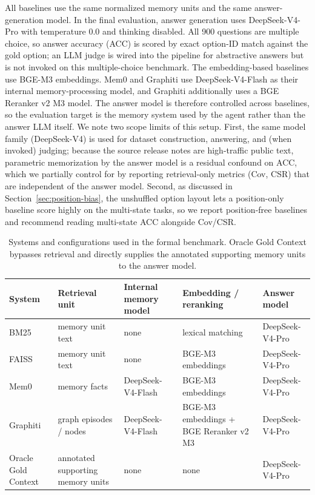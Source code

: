 All baselines use the same normalized memory units and the same answer-generation model. In the final evaluation, answer generation uses DeepSeek-V4-Pro with temperature 0.0 and thinking disabled. All 900 questions are multiple choice, so answer accuracy (ACC) is scored by exact option-ID match against the gold option; an LLM judge is wired into the pipeline for abstractive answers but is not invoked on this multiple-choice benchmark. The embedding-based baselines use BGE-M3 embeddings. Mem0 and Graphiti use DeepSeek-V4-Flash as their internal memory-processing model, and Graphiti additionally uses a BGE Reranker v2 M3 model. The answer model is therefore controlled across baselines, so the evaluation target is the memory system used by the agent rather than the answer LLM itself. We note two scope limits of this setup. First, the same model family (DeepSeek-V4) is used for dataset construction, answering, and (when invoked) judging; because the source release notes are high-traffic public text, parametric memorization by the answer model is a residual confound on ACC, which we partially control for by reporting retrieval-only metrics (Cov, CSR) that are independent of the answer model. Second, as discussed in Section~\ref{sec:position-bias}, the unshuffled option layout lets a position-only baseline score highly on the multi-state tasks, so we report position-free baselines and recommend reading multi-state ACC alongside Cov/CSR.

\begin{table}[t]
\centering
\scriptsize
\caption{Systems and configurations used in the formal benchmark. Oracle Gold Context bypasses retrieval and directly supplies the annotated supporting memory units to the answer model.}
\label{tab:systems}
\begin{tabularx}{\textwidth}{@{}>{\raggedright\arraybackslash}p{}>{\raggedright\arraybackslash}p{}>{\raggedright\arraybackslash}p{}>{\raggedright\arraybackslash}X>{\raggedright\arraybackslash}p{}@{}}
\toprule
System & Retrieval unit & Internal memory model & Embedding / reranking & Answer model \\
\midrule
BM25 & memory unit text & none & lexical matching & DeepSeek-V4-Pro \\
FAISS & memory unit text & none & BGE-M3 embeddings & DeepSeek-V4-Pro \\
Mem0 & memory facts & DeepSeek-V4-Flash & BGE-M3 embeddings & DeepSeek-V4-Pro \\
Graphiti & graph episodes / nodes & DeepSeek-V4-Flash & BGE-M3 embeddings + BGE Reranker v2 M3 & DeepSeek-V4-Pro \\
Oracle Gold Context & annotated supporting memory units & none & none & DeepSeek-V4-Pro \\
\bottomrule
\end{tabularx}
\end{table}

